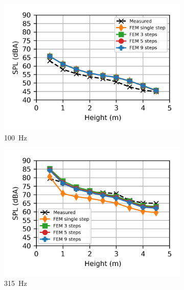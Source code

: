 \begin{figure}
	\centering
	\begin{subfigure}[b]{0.49\textwidth}
		\centering
		\includegraphics{fig/chap5/freq_steps/third_octave_over_height/100_Hz.png}
		\caption{\SI{100}{\hertz}}
	\end{subfigure}
	\hfill
	\begin{subfigure}[b]{0.49\textwidth}
		\centering
		\includegraphics{fig/chap5/freq_steps/third_octave_over_height/315_Hz.png}
		\caption{\SI{315}{\hertz}}
	\end{subfigure}
	\\
	\begin{subfigure}[b]{0.49\textwidth}
		\centering

\end{subfigure}
\end{figure}
